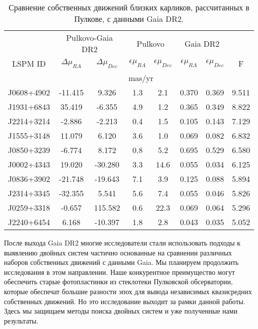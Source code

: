 \begin{table} [htbp]
	\centering
	\caption{Сравнение собственных движений близких карликов, рассчитанных в Пулкове, с данными Gaia DR2.}%
	\label{tab:pul-gaia}%
	\begin{tabularx}{\textwidth}{ c | c | c | c |c | c | c | c }
	  \hline
           & \multicolumn{2}{c|}{Pulkovo-Gaia DR2} &   \multicolumn{2}{c|}{Pulkovo}    &   \multicolumn{2}{c|}{Gaia DR2}    &       \\ \cline{2-7}
 LSPM ID   &    $\Delta\mu_{RA}$    &   $\Delta\mu_{Dec}$   & $\epsilon\mu_{RA}$ & $\epsilon\mu_{Dec}$ & $\epsilon\mu_{RA}$  & $\epsilon\mu_{Dec}$ & F     \\ \cline{2-7}
           &        \multicolumn{6}{c|}{mas/yr}            &       \\ \hline
J0608+4902 & -11.415 &   9.326 & 1.3  &  2.1  & 0.370 & 0.369 & 9.511 \\
J1931+6843 &  35.419 &  -6.355 & 4.9  &  1.2  & 0.365 & 0.349 & 8.822 \\
J2214+3214 &  -2.886 &  -2.213 & 0.4  &  1.5  & 0.105 & 0.143 & 7.129 \\
J1555+3148 &  11.079 &   6.120 & 3.6  &  1.0  & 0.069 & 0.082 & 6.832 \\
J0850+3239 &  -6.774 &   8.172 & 0.8  &  5.2  & 0.695 & 0.529 & 6.580 \\
J0002+4343 &  19.020 & -30.280 & 3.3  & 14.6  & 0.055 & 0.034 & 6.125 \\
J0836+3902 & -21.748 & -19.643 & 7.1  &  3.9  & 0.125 & 0.088 & 5.894 \\
J2314+3345 & -32.355 &   5.541 & 5.6  &  7.4  & 0.055 & 0.046 & 5.826 \\
J0259+3318 &  -0.657 & 115.582 & 0.6  & 22.3  & 0.069 & 0.064 & 5.296 \\
J2240+6454 &   6.168 & -10.397 & 1.8  &  2.8  & 0.043 & 0.035 & 5.052 \\
\hline
	\end{tabularx}%
\end{table}

После выхода Gaia DR2 многие исследователи стали использовать подходы к выявлению двойных систем частично основанные на сравнении различных наборов собственных движений с данными Gaia. Мы планируем продолжить исследования в этом направлении. Наше конкурентное преимущество могут обеспечить старые фотопластинки из стеклотеки Пулковской обсерватории, которые обеспечат большие разности эпох для вывода независимых квазисредних собственных движений. Но это исследование выходит за рамки данной работы. Здесь мы защищаем методы поиска двойных систем и уже полученные нами результаты.